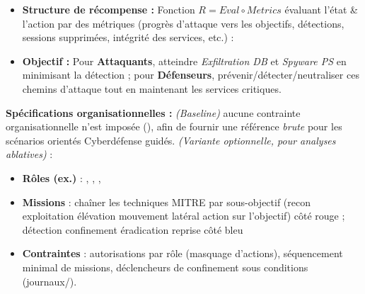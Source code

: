\begin{itemize}
\begin{enumerate*}[label={\alph*)}, itemjoin={; \ }]
        \end{enumerate*}
  \item \textbf{Structure de récompense :} Fonction $R = Eval \circ Metrics$ évaluant l'état \& l'action par des métriques (progrès d'attaque vers les objectifs, détections, sessions supprimées, intégrité des services, etc.) :
  \item \textbf{Objectif :} Pour \textbf{Attaquants}, atteindre \emph{Exfiltration DB} et \emph{Spyware PS} en minimisant la détection ; pour \textbf{Défenseurs}, prévenir/détecter/neutraliser ces chemins d'attaque tout en maintenant les services critiques.
\end{itemize}

\medskip
\textbf{Spécifications organisationnelles :} \emph{(Baseline)} aucune contrainte organisationnelle n'est imposée (), afin de fournir une référence \emph{brute} pour les scénarios orientés Cyberdéfense guidés. \emph{(Variante optionnelle, pour analyses ablatives)} :
\begin{itemize}
  \item \textbf{Rôles (ex.)} : , , , 
  \item \textbf{Missions} : chaîner les techniques MITRE par sous-objectif (recon \textrightarrow{} exploitation \textrightarrow{} élévation \textrightarrow{} mouvement latéral \textrightarrow{} action sur l'objectif) côté rouge ; détection \textrightarrow{} confinement \textrightarrow{} éradication \textrightarrow{} reprise côté bleu
  \item \textbf{Contraintes} : autorisations par rôle (masquage d'actions), séquencement minimal de missions, déclencheurs de confinement sous conditions (journaux/).
\end{itemize}

